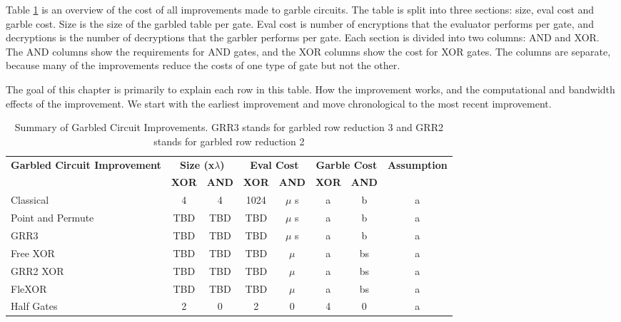 Table \ref{tbl:gc-costs} is an overview of the cost of all improvements made to garble circuits.
The table is split into three sections: size, eval cost and garble cost.
Size is the size of the garbled table per gate.
Eval cost is number of encryptions that the evaluator performs per gate, and decryptions is the number of decryptions that the garbler performs per gate.
Each section is divided into two columns: AND and XOR.
The AND columns show the requirements for AND gates, and the XOR columns show the cost for XOR gates.
The columns are separate, because many of the improvements reduce the costs of one type of gate but not the other.

The goal of this chapter is primarily to explain each row in this table.
How the improvement works, and the computational and bandwidth effects of the improvement.
We start with the earliest improvement and move chronological to the most recent improvement.

\begin{table}[t]
    \label{tbl:gc-costs}
    \centering
    \renewcommand{\arraystretch}{1.2}
    \begin{adjustbox}{width=1\textwidth}
        \begin{tabular}{|p{5cm}|c|c|c|c|c|c|c|}
            \hline
            \multirow{2}{5cm}{\centering \textbf{Garbled Circuit Improvement}} & 
            \multicolumn{2}{c|}{\textbf{Size (x$\lambda$)}} & 
            \multicolumn{2}{c|}{\textbf{Eval Cost}} & 
            \multicolumn{2}{c|}{\textbf{Garble Cost}} &
            \multirow{2}{3cm}{\centering \textbf{Assumption}} \\
            \cline{2-7}
            & \textbf{XOR} & \textbf{AND} & \textbf{XOR} & \textbf{AND}  & \textbf{XOR} & \textbf{AND} & \\
            \hline
            Classical & 4 & 4 & 1024 & $\mu$ s & a & b & a\\ \hline
            Point and Permute & TBD & TBD & TBD & $\mu$ s & a & b & a\\ \hline
            GRR3 & TBD & TBD & TBD & $\mu$ s  & a & b& a\\ \hline
            Free XOR & TBD & TBD & TBD & $\mu$ & a & bs& a  \\ \hline
            GRR2 XOR & TBD & TBD & TBD & $\mu$ & a & bs  & a\\ \hline
            FleXOR& TBD & TBD & TBD & $\mu$ & a & bs & a \\ \hline
            Half Gates & 2 & 0 & 2 & 0 & 4 & 0 & a \\ \hline
        \end{tabular}
    \end{adjustbox}
    \caption{Summary of Garbled Circuit Improvements. GRR3 stands for garbled row reduction 3 and GRR2 stands for garbled row reduction 2}
\end{table}

